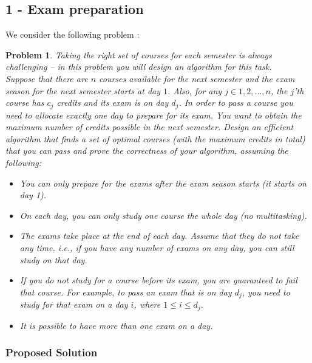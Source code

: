 \documentclass{article}
\newtheorem{problem}{Problem}
\begin{document}
\begin{flushleft}

\subsection*{1 - Exam preparation}

We consider the following problem :
\begin{problem}
    Taking the right set of courses for each semester is always challenging – in this problem you will design an algorithm for this task. \\
    Suppose that there are $n$ courses available for the next semester and the exam season for the next semester starts at day $1$. Also, for any $j \in {1, 2, . . . , n}$, the $j$’th course has $c_j$ credits and its exam is on day $d_j$. In order to pass a course you need to allocate exactly one day to prepare for its exam. You want to obtain the maximum number of credits possible in the next semester. Design an efficient algorithm that finds a set of optimal courses (with the maximum credits in total) that you can pass and prove the correctness of your algorithm, assuming the following:
    \begin{itemize}
        \item You can only prepare for the exams after the exam season starts (it starts on day 1).
        \item On each day, you can only study one course the whole day (no multitasking).
        \item The exams take place at the end of each day. Assume that they do not take any time, i.e., if you have any number of exams on any day, you can still study on that day.
        \item If you do not study for a course before its exam, you are guaranteed to fail that course. For example, to pass an exam that is on day $d_j$, you need to study for that exam on a day $i$, where $1 \leq i \leq d_j$.
        \item It is possible to have more than one exam on a day.
    \end{itemize}

\end{problem}

\subsubsection*{Proposed Solution}


\end{flushleft}
\end{document}
